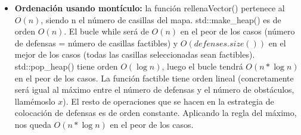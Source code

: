 \begin{itemize}
    \item \textbf{Ordenaci\'on usando mont\'iculo:} la funci\'on rellenaVector() pertenece al $O(n)$, siendo n el n\'umero de casillas del mapa. 
    std::make\_heap() es de orden $O(n)$. El bucle while ser\'a de $O(n)$ en el peor de los casos (n\'umero de defensas = n\'umero de casillas factibles) y $O(defenses.size())$ en 
    el mejor de los casos (todas las casillas seleccionadas sean factibles). std::pop\_heap() tiene orden $O(\log n)$, 
    luego el bucle tendr\'a $O(n*\log n)$ en el peor de los casos.
    La funci\'on factible tiene orden lineal (concretamente ser\'a igual al m\'aximo entre el n\'umero de defensas y el n\'umero de obst\'aculos, llam\'emoslo $x$).
    El resto de operaciones que se hacen en la estrategia de colocaci\'on de defensas es de orden constante. 
    Aplicando la regla del m\'aximo, nos queda $O(n*\log n)$ en el peor de los casos. 
\end{itemize}
